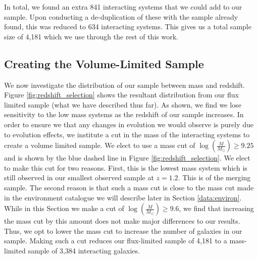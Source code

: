 In total, we found an extra 841 interacting systems that we could add to our sample. Upon conducting a de-duplication of these with the sample already found, this was reduced to 634 interacting systems. This gives us a total sample size of 4,181 which we use through the rest of this work.

\subsection{Creating the Volume-Limited Sample}
\noindent We now investigate the distribution of our sample between mass and redshift. Figure \ref{fig:redshift_selection} shows the resultant distribution from our flux limited sample (what we have described thus far). As shown, we find we lose sensitivity to the low mass systems as the redshift of our sample increases. In order to ensure we that any changes in evolution we would observe is purely due to evolution effects, we institute a cut in the mass of the interacting systems to create a volume limited sample. We elect to use a mass cut of $\log(\frac{M}{M_\odot}) \geq 9.25$ and is shown by the blue dashed line in Figure \ref{fig:redshift_selection}. We elect to make this cut for two reasons. First, this is the lowest mass system which is still observed in our smallest observed sample at $z = 1.2$. This is of the merging sample. The second reason is that such a mass cut is close to the mass cut made in the environment catalogue we will describe later in Section \ref{data:environ}. While in this Section we make a cut of $\log(\frac{M}{M_\odot}) \geq 9.6$, we find that increasing the mass cut by this amount does not make major differences to our results. Thus, we opt to lower the mass cut to increase the number of galaxies in our sample. Making such a cut reduces our flux-limited sample of 4,181 to a mass-limited sample of 3,384 interacting galaxies.


